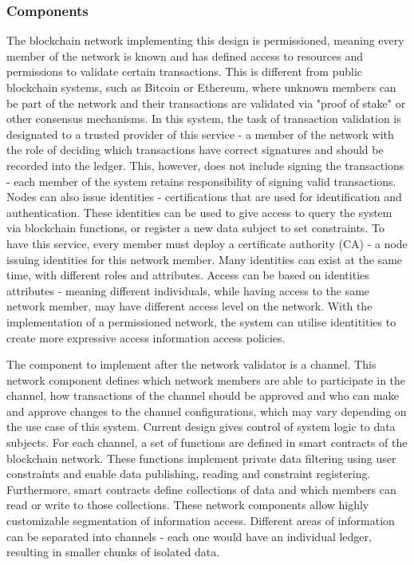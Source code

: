 \documentclass[12pt]{article}
\begin{document}
    \subsubsection{Components}
    The blockchain network implementing this design is permissioned, meaning every member of the network is known and has defined access to resources and permissions to validate certain transactions. This is different from public blockchain systems, such as Bitcoin\cite{bitcoin} or Ethereum\cite{ethereum}, where unknown members can be part of the network and their transactions are validated via "proof of stake" or other consensus mechanisms. In this system, the task of transaction validation is designated to a trusted provider of this service - a member of the network with the role of deciding which transactions have correct signatures and should be recorded into the ledger. This, however, does not include signing the transactions - each member of the system retains responsibility of signing valid transactions. Nodes can also issue identities - certifications that are used for identification and authentication. These identities can be used to give access to query the system via blockchain functions, or register a new data subject to set constraints. To have this service, every member must deploy a certificate authority (CA) - a node issuing identities for this network member. Many identities can exist at the same time, with different roles and attributes. Access can be based on identities attributes - meaning different individuals, while having access to the same network member, may have different access level on the network. With the implementation of a permissioned network, the system can utilise identitities to create more expressive access information access policies.
    
    The component to implement after the network validator is a channel. This network component defines which network members are able to participate in the channel, how transactions of the channel should be approved and who can make and approve changes to the channel configurations, which may vary depending on the use case of this system. Current design gives control of system logic to data subjects. For each channel, a set of functions are defined in smart contracts of the blockchain network. These functions implement private data filtering using user constraints and enable data publishing, reading and constraint registering. Furthermore, smart contracts define collections of data and which members can read or write to those collections. These network components allow highly customizable segmentation of information access. Different areas of information can be separated into channels - each one would have an individual ledger, resulting in smaller chunks of isolated data.
\end{document}
